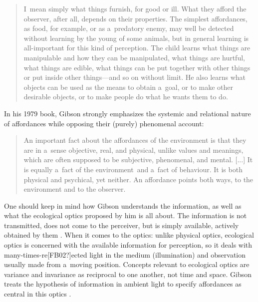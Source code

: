 \documentclass[%
manuscript=article,
year=2024,
volume=77,
doi=00000.000,
]{zfn}
\begin{document}
\begin{quote}
I~mean simply what things furnish, for good or ill. What they afford the observer, after all, depends on their properties. The simplest affordances, as food, for example, or as a~predatory enemy, may well be detected without learning by the young of some animals, but in general learning is all-important for this kind of perception. The child learns what things are manipulable and how they can be manipulated, what things are hurtful, what things are edible, what things can be put together with other things or put inside other things---and so on without limit. He also learns what objects can be used as the means to obtain a~goal, or to make other desirable objects, or to make people do what he wants them to do. 
\parencite[][p.285]{gibson_senses_1966}%
\end{quote}




In his 1979 book, Gibson strongly emphasizes the systemic and relational nature of affordances while opposing their (purely) phenomenal account:



\begin{quote}
An important fact about the affordances of the environment is that they are in a~sense objective, real, and physical, unlike values and meanings, which are often supposed to be subjective, phenomenal, and mental. [...] It is equally a~fact of the environment~and a~fact of behaviour. It is both physical and psychical, yet neither. An affordance points both ways, to the environment and to the observer. 
\parencite[][p.129]{gibson_ecological_1979}%
\end{quote}




One should keep in mind how Gibson understands the information, as well as what the ecological optics proposed by him is all about. The information is not transmitted, does not come to the perceiver, but is simply available, actively obtained by them 
\parencite[][p.307]{gibson_ecological_1979}. %
 When it comes to the optics: unlike physical optics, ecological optics is concerned with the available information for perception, so it deals with many-times-re[FB02?]ected light in the medium (illumination) and observation usually made from a~moving position. Concepts relevant to ecological optics are variance and invariance as reciprocal to one another, not time and space. Gibson treats the hypothesis of information in ambient light to specify affordances as central in this optics 
\parencite[][pp.47–64, 307–309]{gibson_ecological_1979}.%
\end{document}

